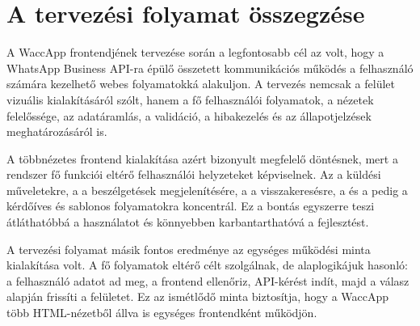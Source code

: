 \section{A tervezési folyamat összegzése}

A WaccApp frontendjének tervezése során a legfontosabb cél az volt, hogy a WhatsApp Business API-ra épülő összetett kommunikációs működés a felhasználó számára kezelhető webes folyamatokká alakuljon. A tervezés nemcsak a felület vizuális kialakításáról szólt, hanem a fő felhasználói folyamatok, a nézetek felelőssége, az adatáramlás, a validáció, a hibakezelés és az állapotjelzések meghatározásáról is.

A többnézetes frontend kialakítása azért bizonyult megfelelő döntésnek, mert a rendszer fő funkciói eltérő felhasználói helyzeteket képviselnek. Az  a küldési műveletekre, a  a beszélgetések megjelenítésére, a  a visszakeresésre, a  és a  pedig a kérdőíves és sablonos folyamatokra koncentrál. Ez a bontás egyszerre teszi átláthatóbbá a használatot és könnyebben karbantarthatóvá a fejlesztést.

A tervezési folyamat másik fontos eredménye az egységes működési minta kialakítása volt. A fő folyamatok eltérő célt szolgálnak, de alaplogikájuk hasonló: a felhasználó adatot ad meg, a frontend ellenőriz, API-kérést indít, majd a válasz alapján frissíti a felületet. Ez az ismétlődő minta biztosítja, hogy a WaccApp több HTML-nézetből állva is egységes frontendként működjön.
